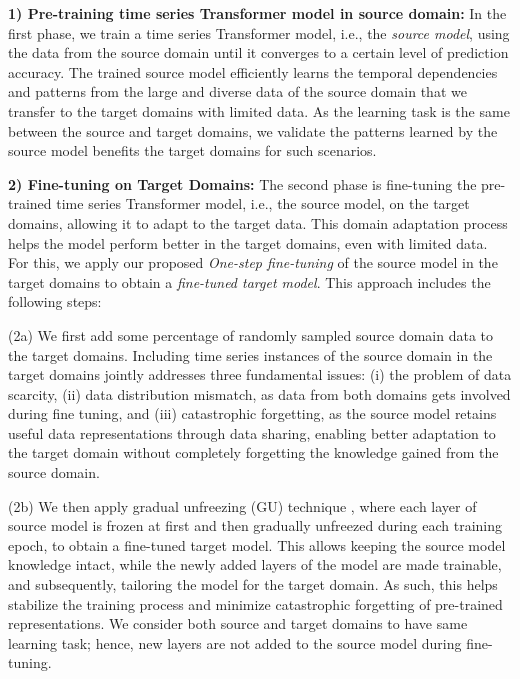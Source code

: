 \documentclass[letterpaper]{article} %
\begin{document}
\hspace{0.12in}\textbf{1) Pre-training time series Transformer model in source domain:} In the first phase, we train a time series Transformer model, i.e., the \emph{source model}, using the data from the source domain until it converges to a certain level of prediction accuracy. The trained source model efficiently learns the temporal dependencies and patterns from the large and diverse data of the source domain that we transfer to the target domains with limited data. As the learning task is the same between the source and target domains, we validate the patterns learned by the source model benefits the target domains for such scenarios.

\textbf{2) Fine-tuning on Target Domains:} The second phase is fine-tuning the pre-trained time series Transformer model, i.e., the source model, on the target domains, allowing it to adapt to the target data. This domain adaptation process helps the model perform better in the target domains, even with limited data. For this, we apply our proposed {\em One-step fine-tuning} of the source model in the target domains to obtain a \emph{fine-tuned target model}. This approach includes the following steps:

(2a) We first add some percentage of randomly sampled source domain data to the target domains. Including time series instances of the source domain in the target domains jointly addresses three fundamental issues: (i) the problem of data scarcity, (ii) data distribution mismatch, as data from both domains gets involved during fine tuning, and (iii) catastrophic forgetting, as the source model retains useful data representations through data sharing, enabling better adaptation to the target domain without completely forgetting the knowledge gained from the source domain.

(2b) We then apply gradual unfreezing (GU) technique \cite{howard2018universal}, where each layer of source model is frozen at first and then gradually unfreezed during each training epoch, to obtain a fine-tuned target model. This allows keeping the source model knowledge intact, while the newly added layers of the model are made trainable, and subsequently, tailoring the model for the target domain. As such, this helps stabilize the training process and minimize catastrophic forgetting of pre-trained representations. We consider both source and target domains to have same learning task; hence, new layers are not added to the source model during fine-tuning.
\end{document}
